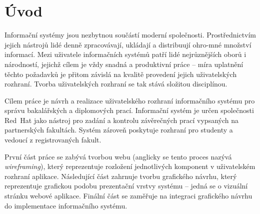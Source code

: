 \chapter{Úvod}

Informační systémy jsou nezbytnou součástí moderní společnosti. Prostřednictvím jejich nástrojů lidé denně zpracovávají, ukládají a distribuují ohro-mné množství informací. Mezi uživatele informačních systémů patří lidé nejrůznějších oborů i národností, jejichž cílem je vždy snadná a produktivní práce -- míra uplatnění těchto požadavků je přitom závislá na kvalitě provedení jejich uživatelských rozhraní. Tvorba uživatelských rozhraní se tak stává složitou disciplínou.

Cílem práce je návrh a realizace uživatelského rozhraní informačního systému pro správu bakalářských a diplomových prací. Informační systém je určen společnosti Red~Hat jako nástroj pro zadání a kontrolu závěrečných prací vypsaných na partnerských fakultách. Systém zároveň poskytuje rozhraní pro studenty a vedoucí z registrovaných fakult.

První část práce se zabývá tvorbou  webu (anglicky se tento proces nazývá \textit{wireframing}), který reprezentuje rozložení jednotlivých komponent v uživatelském rozhraní aplikace. Následující část zahrnuje tvorbu grafického návrhu, který reprezentuje grafickou podobu prezentační vrstvy systému -- jedná se o vizuální stránku webové aplikace. Finální část se zaměřuje na integraci grafického návrhu do implementace informačního systému.
